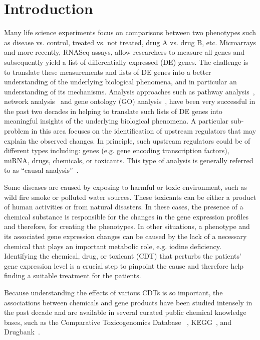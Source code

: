 \section{Introduction}
\label{chap:Introduction}


Many life science experiments focus on comparisons between two phenotypes such as disease vs. control, treated vs. not treated, drug A vs. drug B, etc. Microarrays and more recently, RNASeq assays, allow researchers to measure all genes and subsequently  yield a list of differentially expressed (DE) genes. The challenge is to translate these measurements and lists of DE genes into a better understanding of the underlying biological phenomena, and in particular an understanding of its mechanisms. Analysis approaches such as pathway analysis~\cite{DraghiciOntologicalToolsReview:2005,Khatri:2012, mitrea2013methods, tarca2013comparison, nguyen2018network, ihnatova2018critical, nguyen2019identifying}, network analysis~\cite{mitra2013integrative} and gene ontology (GO) analysis~\cite{DraghiciOntologicalToolsReview:2005,Rhee:2008}, have been very successful in the past two decades in helping to translate such lists of DE genes into meaningful insights of the underlying biological phenomena. A particular sub-problem in this area focuses on the identification of upstream regulators that may explain the observed changes. In principle, such upstream regulators could be of different types including: genes (e.g. gene encoding transcription factors), miRNA, drugs, chemicals, or toxicants. This type of analysis is generally referred to as ``causal analysis''~\cite{schadt:2005, chindelevitch2012causal, kramer2013causal, felciano2013predictive}. 


Some diseases are caused by exposing to harmful or toxic environment, such as wild fire smoke or polluted water sources. These toxicants can be either a product of human activities or from natural disasters. In these cases, the presence of a chemical substance  is responsible for the changes in  the gene expression profiles and  therefore, for creating the phenotypes. 
In other situations,  a phenotype and its associated  gene expression changes  can be caused by the lack of a necessary chemical  that plays an important metabolic role, e.g. iodine deficiency. 
Identifying the chemical, drug, or toxicant (CDT) that perturbs the patients' gene expression level is a crucial step to pinpoint the cause and therefore help finding a suitable treatment for the patients.


Because understanding the effects of various CDTs is so important, the associations between chemicals and gene products have been studied intensely in the past decade and are available in several curated public chemical knowledge bases, such as the Comparative Toxicogenomics Database ~\cite{mattingly2006comparative}, KEGG~\cite{Kanehisa:2000}, and Drugbank~\cite{law2014drugbank}. 



